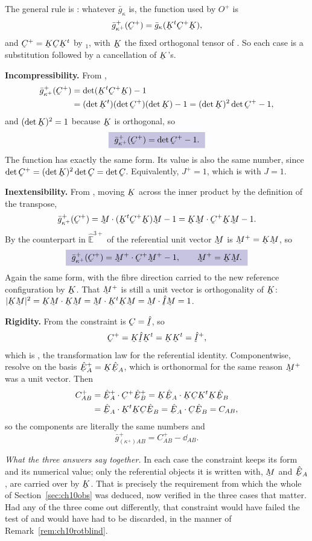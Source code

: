\begin{solution}
The general rule is : whatever $\bar g_{\kappa}$ is, the
function used by $O^{+}$ is
\[
   \bar g^{+}_{\kappa^{+}}(\bC^{+})=\bar g_{\kappa}(\bK^{t}\bC^{+}\bK),
\]
and $\bC^{+}=\bK\bC\bK^{t}$ by $_{1}$, with $\bK$ the fixed
orthogonal tensor of . So each case is a substitution followed
by a cancellation of $\bK$'s.

\textbf{Incompressibility.} From ,
\[
\begin{aligned}
   \bar g^{+}_{\kappa^{+}}(\bC^{+})&=\det(\bK^{t}\bC^{+}\bK)-1
   \\
   &=(\det\bK^{t})(\det\bC^{+})(\det\bK)-1
   =(\det\bK)^{2}\det\bC^{+}-1 ,
\end{aligned}
\]
and $(\det\bK)^{2}=1$ because $\bK$ is orthogonal, so
\[
   \boxed{\ \bar g^{+}_{\kappa^{+}}(\bC^{+})=\det\bC^{+}-1 .\ }
\]
The function has exactly the same form. Its value is also the same
number, since $\det\bC^{+}=(\det\bK)^{2}\det\bC=\det\bC$. Equivalently,
$J^{+}=1$, which is  with $J=1$.

\textbf{Inextensibility.} From , moving $\bK$ across the inner
product by the definition of the transpose,
\[
   \bar g^{+}_{\kappa^{+}}(\bC^{+})
   =\ip\bM{(\bK^{t}\bC^{+}\bK)\bM}-1
   =\ip{\bK\bM}{\bC^{+}\bK\bM}-1 .
\]
By  the counterpart in $\hat{\mathbb{E}}^{3+}$ of the
referential unit vector $\bM$ is $\bM^{+}=\bK\bM$, so
\[
   \boxed{\ \bar g^{+}_{\kappa^{+}}(\bC^{+})
   =\ip{\bM^{+}}{\bC^{+}\bM^{+}}-1,\qquad \bM^{+}=\bK\bM .\ }
\]
Again the same form, with the fibre direction carried to the new
reference configuration by $\bK$. That $\bM^{+}$ is still a unit vector
is orthogonality of $\bK$: $|\bK\bM|^{2}=\ip{\bK\bM}{\bK\bM}
=\ip\bM{\bK^{t}\bK\bM}=\ip\bM{\hI\bM}=1$.

\textbf{Rigidity.} From  the constraint is $\bC=\hI$, so
\[
   \bC^{+}=\bK\hI\bK^{t}=\bK\bK^{t}=\hI^{+},
\]
which is , the transformation law for the referential identity.
Componentwise, resolve on the basis $\hbE^{+}_{A}=\bK\hbE_{A}$, which is
orthonormal for the same reason $\bM^{+}$ was a unit vector. Then
\[
\begin{aligned}
   C^{+}_{AB}&=\ip{\hbE^{+}_{A}}{\bC^{+}\hbE^{+}_{B}}
   =\ip{\bK\hbE_{A}}{\bK\bC\bK^{t}\bK\hbE_{B}}
   \\
   &=\ip{\hbE_{A}}{\bK^{t}\bK\bC\hbE_{B}}
   =\ip{\hbE_{A}}{\bC\hbE_{B}}=C_{AB},
\end{aligned}
\]
so the components are literally the same numbers and
\[
   \boxed{\ \bar g^{+}_{(\kappa^{+})AB}=C^{+}_{AB}-\dd_{AB}.\ }
\]

\emph{What the three answers say together.} In each case the constraint
keeps its form and its numerical value; only the referential objects it
is written with, $\bM$ and $\hbE_{A}$, are carried over by $\bK$. That is
precisely the requirement  from which the whole of
Section~\ref{sec:ch10obs} was deduced, now verified in the three cases
that matter. Had any of the three come out differently, that constraint
would have failed the test of  and would have had to be
discarded, in the manner of Remark~\ref{rem:ch10rotblind}.
\end{solution}


